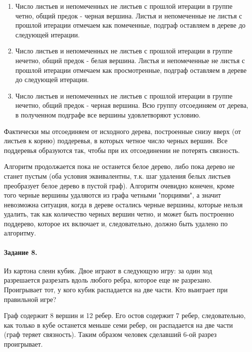 \documentclass[a4paper,12pt]{article}
\begin{document}
\begin{Solution}
\begin{enumerate}
\item Число листьев и непомеченных не листьев с прошлой итерации в группе четно, общий предок - черная вершина. Листья и непомеченные не листья с прошлой итерации отмечаем как помеченные, подграф оставляем в дереве до следующей итерации.

\item Число листьев и непомеченных не листьев с прошлой итерации в группе нечетно, общий предок - белая вершина. Листья и непомеченные не листья с прошлой итерации отмечаем как просмотренные, подграф оставляем в дереве до следующей итерации.

\item Число листьев и непомеченных не листьев с прошлой итерации в группе нечетно, общий предок - черная вершина. Всю группу отсоединяем от дерева, в полученном подграфе все вершины удовлетворяют условию.
\end{enumerate}

Фактически мы отсоединяем от исходного дерева, построенные снизу вверх (от листьев к корню) поддеревья, в которых четное число черных вершин. Все поддеревья образуются так, чтобы при их отсоединении не потерять связность.

Алгоритм продолжается пока не останется белое дерево, либо пока дерево не станет пустым (оба условия эквивалентны, т.к. шаг удаления белых листьев преобразует белое дерево в пустой граф). Алгоритм очевидно конечен, кроме того черные вершины удаляются из графа четными "порциями", а значит невозможна ситуация, когда в дереве остались черные вершины, которые нельзя удалить, так как количество черных вершин четно, и может быть построенно поддерево, которое их включает и, следовательно, должно быть удалено по алгоритму.

\end{Solution}

\paragraph{Задание 8.} Из картона слеин кубик. Двое играют в следующую игру: за один ход разрешается разрезать вдоль любого ребра, которое еще не разрезано. Проигрывает тот, у кого кубик распадается на две части. Кто выиграет при правильной игре?
\begin{Solution}
Граф содержит 8 вершин и 12 ребер. Его остов содержит 7 ребер, следовательно, как только в кубе останется меньше семи ребер, он распадается на две части (граф теряет связность). Таким образом человек сделавший 6-ой разрез проигрывает.
\end{Solution}
\end{document}
